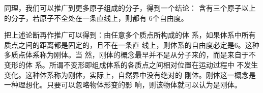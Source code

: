 同理，我们可以推广到更多原子组成的分子，得到一个结论：
含有三个原子以上的分子，若原子不全处在一条直线上，则都有
$ 6 $个自由度。

把上述论断再作推广可以得到：由任意多个质点所构成的体
系，如果体系中所有质点之间的距离都是固定的，且不在一条直
线上，则体系的自由度必定是$ 6 $。这种多质点体系称为刚体。当
然，刚体的概念最早并不是从分子来的，而是来自于不变形的体
系。所谓不变形即组成体系的各质点之间相对位置在运动过程中
不发生变化。这种体系称为刚体，实际上，自然界中没有绝对的
刚体。刚体这一概念是一种理想化。只要可以忽略物体形变的影
响，则该物体就可以认为是刚体。